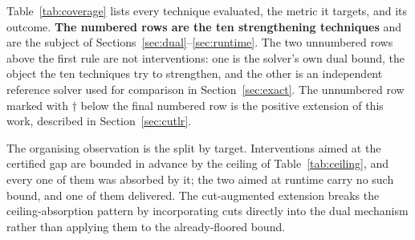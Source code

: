 Table~\ref{tab:coverage} lists every technique evaluated, the metric it targets, and its outcome. \textbf{The numbered rows are the ten strengthening techniques} and are the subject of Sections~\ref{sec:dual}--\ref{sec:runtime}. The two unnumbered rows above the first rule are not interventions: one is the solver's own dual bound, the object the ten techniques try to strengthen, and the other is an independent reference solver used for comparison in Section~\ref{sec:exact}. The unnumbered row marked with $\dagger$ below the final numbered row is the positive extension of this work, described in Section~\ref{sec:cutlr}.

The organising observation is the split by target. Interventions aimed at the certified gap are bounded in advance by the ceiling of Table~\ref{tab:ceiling}, and every one of them was absorbed by it; the two aimed at runtime carry no such bound, and one of them delivered. The cut-augmented extension breaks the ceiling-absorption pattern by incorporating cuts directly into the dual mechanism rather than applying them to the already-floored bound.

